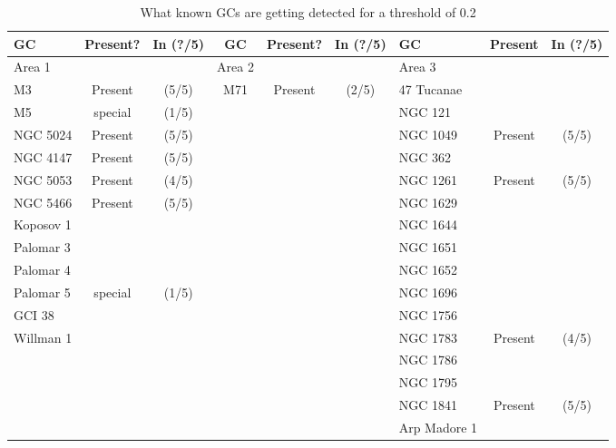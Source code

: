 \begin{table}[H]
    \centering
    \caption{What known GCs are getting detected for a threshold of 0.2}
    \label{tb:areas-found-rasters-0.2}
    \begin{tabular}{l c c c c c l c c}
        \toprule
        GC        & Present? & In (?/5) & GC     & Present? & In (?/5) & GC           & Present & In (?/5) \\
        \midrule
        Area 1    &          &          & Area 2 &          &          & Area 3       &         &          \\
        \midrule
        M3        & Present  & (5/5)    & M71    & Present  & (2/5)    & 47 Tucanae   &         &          \\
        M5        & special  & (1/5)    &        &          &          & NGC 121      &         &          \\
        NGC 5024  & Present  & (5/5)    &        &          &          & NGC 1049     & Present & (5/5)    \\
        NGC 4147  & Present  & (5/5)    &        &          &          & NGC 362      &         &          \\
        NGC 5053  & Present  & (4/5)    &        &          &          & NGC 1261     & Present & (5/5)    \\
        NGC 5466  & Present  & (5/5)    &        &          &          & NGC 1629     &         &          \\
        Koposov 1 &          &          &        &          &          & NGC 1644     &         &          \\
        Palomar 3 &          &          &        &          &          & NGC 1651     &         &          \\
        Palomar 4 &          &          &        &          &          & NGC 1652     &         &          \\
        Palomar 5 & special  & (1/5)    &        &          &          & NGC 1696     &         &          \\
        GCI 38    &          &          &        &          &          & NGC 1756     &         &          \\
        Willman 1 &          &          &        &          &          & NGC 1783     & Present & (4/5)    \\
                  &          &          &        &          &          & NGC 1786     &         &          \\
                  &          &          &        &          &          & NGC 1795     &         &          \\
                  &          &          &        &          &          & NGC 1841     & Present & (5/5)    \\
                  &          &          &        &          &          & Arp Madore 1 &         &          \\
        \bottomrule
    \end{tabular}
\end{table}

